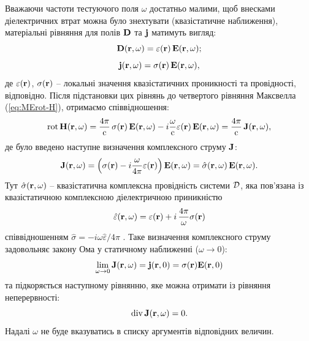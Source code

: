 \documentclass[14pt,twoside]{vakthesis}
\begin{document}
Вважаючи частоти тестуючого поля $\omega$ достатньо малими, щоб внесками діелектричних втрат можна було знехтувати (квазістатичне наближення), матеріальні рівняння для полів ${\bf D}$ та ${\bf j}$ матимуть вигляд:
\begin{equation}\label{eq:materialEquation-D}
{\bf D}({\bf r}, \omega) = \varepsilon({\bf r})\,{\bf E}({\bf r}, \omega);
\end{equation}
\begin{equation}\label{eq:materialEquation-j}
{\bf j}({\bf r}, \omega) = \sigma({\bf r})\,{\bf E}({\bf r}, \omega),
\end{equation}
де $\varepsilon({\bf r})$, $\sigma({\bf r})$ -- локальні значення квазістатичних проникності та провідності, відповідно. 
Після підстановки цих рівнянь до четвертого рівняння Максвелла (\ref{eq:MErot-H}), отримаємо співвідношення:
\begin{equation}\label{eq:MErot-H-material}
{\rm rot}\,{\bf H}({\bf r}, \omega) = \frac{4\pi}{\rm c}\,\sigma({\bf r})\,{\bf E}({\bf r}, \omega) - i\frac{\omega}{\rm c} \varepsilon({\bf r})\, {\bf E}({\bf r}, \omega) = \frac{4\pi}{\rm c}\,{\bf J}({\bf r}, \omega),
\end{equation}
де було введено наступне визначення комплексного струму ${\bf J}$:
\begin{equation}\label{eq:ComplexCurrent-J}
{\bf J}({\bf r}, \omega) = \left(\sigma({\bf r}) - i\frac{\omega}{4\pi} \varepsilon({\bf r}) \right) {\bf E}({\bf r}, \omega) = \hat{\sigma}({\bf r}, \omega)\,{\bf E}({\bf r}, \omega).
\end{equation}
Тут $\hat{\sigma}({\bf r}, \omega)$ --  квазістатична комплексна провідність системи $\cal D$, яка пов'язана із квазістатичною комплексною діелектричною приникністю~\cite{LandauT8}
\begin{equation}\label{eq:eps_complex}
\hat{\varepsilon}({\bf r}, \omega) = \varepsilon ({\bf r}) + i\,\frac{4\pi}{\omega}\sigma({\bf r})
\end{equation}
співвідношенням $\hat{\sigma} = -i\omega {\hat\varepsilon}/4\pi$ \cite{broadband}.
Таке визначення комплексного струму задовольняє закону Ома у статичному наближенні ($\omega\to 0$):
$$
\lim\limits_{\omega \to 0} {\bf J}({\bf r},\omega) = {\bf j}({\bf r}, 0) = \sigma({\bf r}) {\bf E}({\bf r}, 0)
$$
та підкоряється наступному рівнянню, яке можна отримати із рівняння неперервності:
\begin{equation}\label{eq:ComplexCurrent-div}
{\rm div}\,{\bf J}({\bf r}, \omega) = 0.
\end{equation} 
Надалі $\omega$ не буде вказуватись в списку аргументів відповідних величин.
\end{document}
